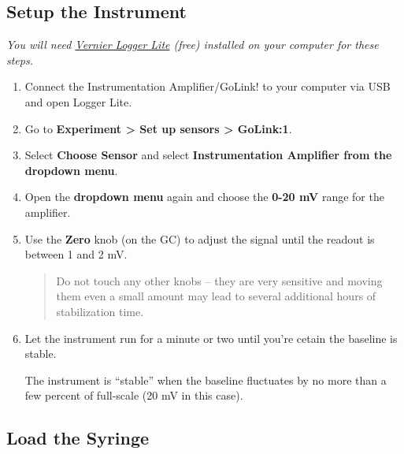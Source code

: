 \documentclass[]{tufte-book}
\begin{document}
\hypertarget{setup-the-instrument}{%
\subsection{Setup the Instrument}\label{setup-the-instrument}}

\emph{You will need \href{https://www.vernier.com/products/software/logger-lite/\#section5}{Vernier Logger Lite} (free) installed on your computer for these steps.}

\begin{enumerate}
\def\labelenumi{\arabic{enumi}.}
\item
  Connect the Instrumentation Amplifier/GoLink! to your computer via USB and open Logger Lite.\\
\item
  Go to \textbf{Experiment \textgreater{} Set up sensors \textgreater{} GoLink:1}.\\
\item
  Select \textbf{Choose Sensor} and select \textbf{Instrumentation Amplifier from the dropdown menu}.\\
\item
  Open the \textbf{dropdown menu} again and choose the \textbf{0-20 mV} range for the amplifier.
\item
  Use the \textbf{Zero} knob (on the GC) to adjust the signal until the readout is between 1 and 2 mV.

  \begin{quote}
  Do not touch any other knobs -- they are very sensitive and moving them even a small amount may lead to several additional hours of stabilization time.
  \end{quote}
\item
  Let the instrument run for a minute or two until you're cetain the baseline is stable.

  \begin{marginfigure}
   The instrument is ``stable'' when the baseline fluctuates by no more
   than a few percent of full-scale (20 mV in this case).
   \end{marginfigure}
\end{enumerate}

\hypertarget{load-the-syringe}{%
\subsection{Load the Syringe}\label{load-the-syringe}}
\end{document}
